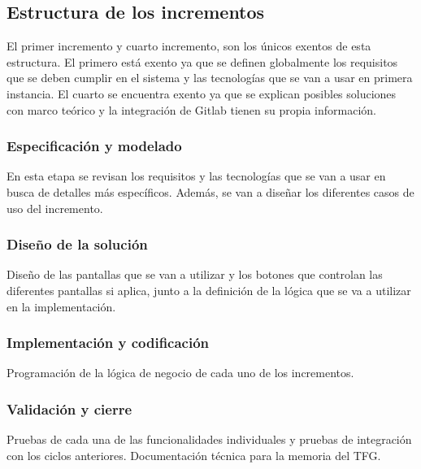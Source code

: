 

\subsection{Estructura de los incrementos}
El primer incremento y cuarto incremento, son los únicos exentos de esta estructura. El primero está exento ya que se definen globalmente los requisitos que se deben cumplir en el sistema y las tecnologías que se van a usar en primera instancia.  El cuarto se encuentra exento ya que se explican posibles soluciones con marco teórico y la integración de Gitlab tienen su propia información. 

\subsubsection{Especificación y modelado} 

En esta etapa se revisan los requisitos y las tecnologías que se van a usar en busca de detalles más específicos. Además, se van a diseñar los diferentes casos de uso del incremento. 

\subsubsection{Diseño de la solución}

Diseño de las pantallas que se van a utilizar y los botones que controlan las diferentes pantallas si aplica, junto a la definición de la lógica que se va a utilizar en la implementación. 

\subsubsection{Implementación y codificación}
Programación de la lógica de negocio de cada uno de los incrementos. 

\subsubsection{Validación y cierre}
Pruebas de cada una de las funcionalidades individuales y pruebas de integración con los ciclos anteriores. Documentación técnica para la memoria del TFG.

